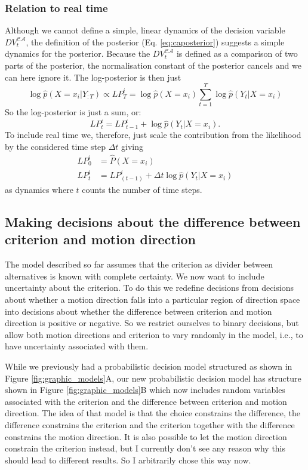\documentclass[10pt,a4paper]{article}
\begin{document}
\subsubsection{Relation to real time}
Although we cannot define a simple, linear dynamics of the decision variable $DV_t^{\mathcal{CA}}$, the definition of the posterior (Eq. \ref{eq:caposterior}) suggests a simple dynamics for the posterior. Because the $DV_t^{\mathcal{CA}}$ is defined as a comparison of two parts of the posterior, the normalisation constant of the posterior cancels and we can here ignore it. The log-posterior is then just
\begin{equation}
\log\hat{p}(X=x_i | Y_{:T}) \propto LP_T^i= \log\hat{p}(X=x_i)\sum_{t=1}^T \log\hat{p}(Y_t | X=x_i)
\end{equation}
So the log-posterior is just a sum, or:
\begin{equation}
LP_t^i = LP_{t-1}^i + \log\hat{p}(Y_t | X=x_i).
\end{equation}
To include real time we, therefore, just scale the contribution from the likelihood by the considered time step $\Delta t$ giving
\begin{align}
LP_0^i &= \hat{P}(X = x_i)\\
LP_{t}^i &= LP_{(t-1)}^i + \Delta t\log\hat{p}(Y_t | X=x_i)
\end{align}
as dynamics where $t$ counts the number of time steps.

\subsection{Making decisions about the difference between criterion and motion direction}
The model described so far assumes that the criterion as divider between alternatives is known with complete certainty. We now want to include uncertainty about the criterion. To do this we redefine decisions from decisions about whether a motion direction falls into a particular region of direction space into decisions about whether the difference between criterion and motion direction is positive or negative. So we restrict ourselves to binary decisions, but allow both motion directions and criterion to vary randomly in the model, i.e., to have uncertainty associated with them.

While we previously had a probabilistic decision model structured as shown in Figure \ref{fig:graphic_models}A, our new probabilistic decision model has structure shown in Figure \ref{fig:graphic_models}B which now includes random variables associated with the criterion and the difference between criterion and motion direction. The idea of that model is that the choice constrains the difference, the difference constrains the criterion and the criterion together with the difference constrains the motion direction. It is also possible to let the motion direction constrain the criterion instead, but I currently don't see any reason why this should lead to different results. So I arbitrarily chose this way now.
\end{document}
